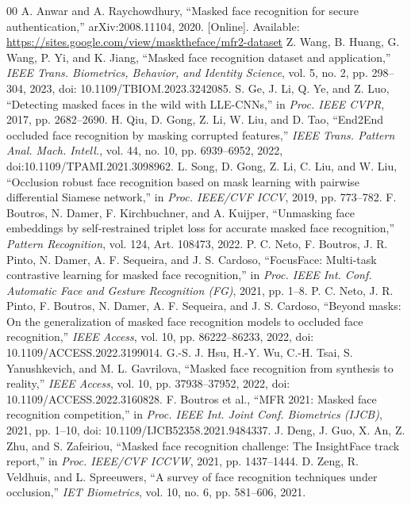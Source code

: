 \documentclass[10pt,journal,compsoc]{IEEEtran}
\begin{document}
\begin{thebibliography}{00}
 A. Anwar and A. Raychowdhury, ``Masked face recognition for secure authentication,'' arXiv:2008.11104, 2020. [Online]. Available: \url{https://sites.google.com/view/masktheface/mfr2-dataset}
 Z. Wang, B. Huang, G. Wang, P. Yi, and K. Jiang, ``Masked face recognition dataset and application,'' \textit{IEEE Trans. Biometrics, Behavior, and Identity Science}, vol. 5, no. 2, pp. 298--304, 2023, doi: 10.1109/TBIOM.2023.3242085.
 S. Ge, J. Li, Q. Ye, and Z. Luo, ``Detecting masked faces in the wild with LLE-CNNs,'' in \textit{Proc. IEEE CVPR}, 2017, pp. 2682--2690.
 H. Qiu, D. Gong, Z. Li, W. Liu, and D. Tao, ``End2End occluded face recognition by masking corrupted features,'' \textit{IEEE Trans. Pattern Anal. Mach. Intell.}, vol. 44, no. 10, pp. 6939--6952, 2022, doi:10.1109/TPAMI.2021.3098962.
 L. Song, D. Gong, Z. Li, C. Liu, and W. Liu, ``Occlusion robust face recognition based on mask learning with pairwise differential Siamese network,'' in \textit{Proc. IEEE/CVF ICCV}, 2019, pp. 773--782.
 F. Boutros, N. Damer, F. Kirchbuchner, and A. Kuijper, ``Unmasking face embeddings by self-restrained triplet loss for accurate masked face recognition,'' \textit{Pattern Recognition}, vol. 124, Art. 108473, 2022.
 P. C. Neto, F. Boutros, J. R. Pinto, N. Damer, A. F. Sequeira, and J. S. Cardoso, ``FocusFace: Multi-task contrastive learning for masked face recognition,'' in \textit{Proc. IEEE Int. Conf. Automatic Face and Gesture Recognition (FG)}, 2021, pp. 1--8.
 P. C. Neto, J. R. Pinto, F. Boutros, N. Damer, A. F. Sequeira, and J. S. Cardoso, ``Beyond masks: On the generalization of masked face recognition models to occluded face recognition,'' \textit{IEEE Access}, vol. 10, pp. 86222--86233, 2022, doi: 10.1109/ACCESS.2022.3199014.
 G.-S. J. Hsu, H.-Y. Wu, C.-H. Tsai, S. Yanushkevich, and M. L. Gavrilova, ``Masked face recognition from synthesis to reality,'' \textit{IEEE Access}, vol. 10, pp. 37938--37952, 2022, doi: 10.1109/ACCESS.2022.3160828.
 F. Boutros et al., ``MFR 2021: Masked face recognition competition,'' in \textit{Proc. IEEE Int. Joint Conf. Biometrics (IJCB)}, 2021, pp. 1--10, doi: 10.1109/IJCB52358.2021.9484337.
 J. Deng, J. Guo, X. An, Z. Zhu, and S. Zafeiriou, ``Masked face recognition challenge: The InsightFace track report,'' in \textit{Proc. IEEE/CVF ICCVW}, 2021, pp. 1437--1444.
 D. Zeng, R. Veldhuis, and L. Spreeuwers, ``A survey of face recognition techniques under occlusion,'' \textit{IET Biometrics}, vol. 10, no. 6, pp. 581--606, 2021.

\end{thebibliography}
\end{document}
